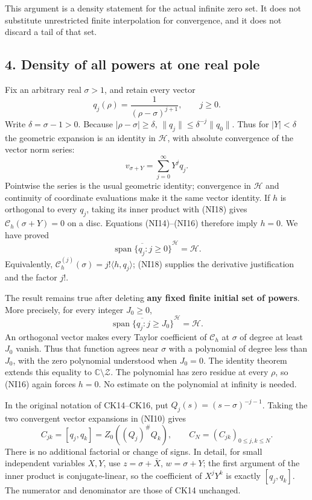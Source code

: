 \documentclass[
  10pt,
  a4paper,
]{article}
\begin{document}
This argument is a density statement for the actual infinite zero set.
It does not substitute unrestricted finite interpolation for
convergence, and it does not discard a tail of that set.

\subsection{4. Density of all powers at one real
pole}\label{density-of-all-powers-at-one-real-pole}

Fix an arbitrary real \(\sigma>1\), and retain every vector \[
q_j(\rho)=\frac1{(\rho-\sigma)^{j+1}},\qquad j\ge0.
\tag{NI17}
\] Write \(\delta=\sigma-1>0\). Because \(|\rho-\sigma|\ge\delta\),
\(\|q_j\|\le\delta^{-j}\|q_0\|\). Thus for \(|Y|<\delta\) the geometric
expansion is an identity in \(\mathcal H\), with absolute convergence of
the vector norm series: \[
v_{\sigma+Y}=\sum_{j=0}^\infty Y^jq_j.
\tag{NI18}
\] Pointwise the series is the usual geometric identity; convergence in
\(\mathcal H\) and continuity of coordinate evaluations make it the same
vector identity. If \(h\) is orthogonal to every \(q_j\), taking its
inner product with (NI18) gives \(\mathcal C_h(\sigma+Y)=0\) on a disc.
Equations (NI14)--(NI16) therefore imply \(h=0\). We have proved \[
\overline{\operatorname{span}\{q_j:j\ge0\}}^{\mathcal H}
=\mathcal H.
\tag{NI19}
\] Equivalently, \(\mathcal C_h^{(j)}(\sigma)=j!\langle h,q_j\rangle\);
(NI18) supplies the derivative justification and the factor \(j!\).

The result remains true after deleting \textbf{any fixed finite initial
set of powers}. More precisely, for every integer \(J_0\ge0\), \[
\overline{\operatorname{span}\{q_j:j\ge J_0\}}^{\mathcal H}
=\mathcal H.
\tag{NI19a}
\] An orthogonal vector makes every Taylor coefficient of
\(\mathcal C_h\) at \(\sigma\) of degree at least \(J_0\) vanish. Thus
that function agrees near \(\sigma\) with a polynomial of degree less
than \(J_0\), with the zero polynomial understood when \(J_0=0\). The
identity theorem extends this equality to
\(\mathbb C\setminus\mathcal Z\). The polynomial has zero residue at
every \(\rho\), so (NI16) again forces \(h=0\). No estimate on the
polynomial at infinity is needed.

In the original notation of CK14--CK16, put
\(Q_j(s)=(s-\sigma)^{-j-1}\). Taking the two convergent vector
expansions in (NI10) gives \[
C_{jk}=[q_j,q_k]
=Z_0((Q_j)^\#Q_k),\qquad
C_N=(C_{jk})_{0\le j,k\le N}.
\tag{NI20}
\] There is no additional factorial or change of signs. In detail, for
small independent variables \(X,Y\), use \(z=\sigma+\bar X\),
\(w=\sigma+Y\); the first argument of the inner product is
conjugate-linear, so the coefficient of \(X^jY^k\) is exactly
\([q_j,q_k]\). The numerator and denominator are those of CK14
unchanged.
\end{document}

